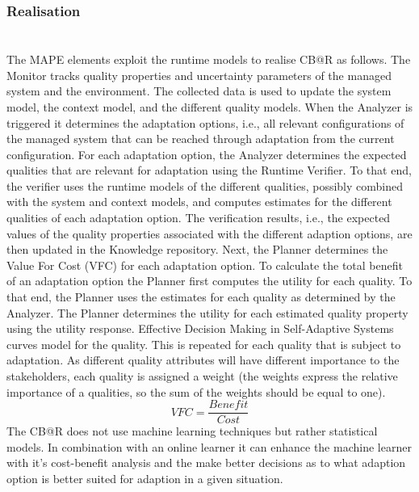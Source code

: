 \documentclass[pdftex,english,oribibl]{llncs}
\begin{document}
\subsubsection{Realisation \\\\}
The MAPE elements exploit the runtime models to realise CB@R as follows. The
Monitor tracks quality properties and uncertainty parameters of the managed
system and the environment. The collected data is used to update the system
model, the context model, and the different quality models. When the Analyzer is triggered it determines the adaptation options, i.e., all relevant
configurations of the managed system that can be reached through adaptation
from the current configuration. For each adaptation option, the Analyzer determines the expected qualities that are relevant for adaptation using the Runtime
Verifier. To that end, the verifier uses the runtime models of the different
qualities, possibly combined with the system and context models, and computes
estimates for the different qualities of each adaptation option. The verification results, i.e., the expected values of the quality properties associated with the
different adaption options, are then updated in the Knowledge repository.
Next, the Planner determines the Value For Cost (VFC) for each adaptation option. To calculate the total benefit of an adaptation option the
Planner first computes the utility for each quality. To that end, the Planner uses
the estimates for each quality as determined by the Analyzer. The Planner determines the utility for each estimated quality property using the utility response. Effective Decision Making in Self-Adaptive Systems
curves model for the quality. This is repeated for each quality that is subject to
adaptation. As different quality attributes will have different importance to the
stakeholders, each quality is assigned a weight (the weights express the relative
importance of a qualities, so the sum of the weights should be equal to one).\\
\begin{equation}
 VFC = \frac{Benefit}{Cost} 
 \end{equation}
 The CB@R does not use machine learning techniques but rather statistical models. In combination with an online learner it can enhance the machine learner with it's cost-benefit analysis and the make better decisions as to what adaption option is better suited for adaption in a given situation.
\end{document}
